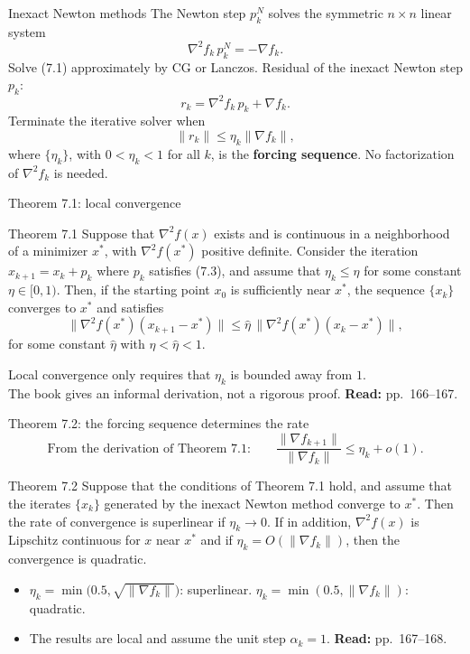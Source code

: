 \documentclass[aspectratio=169,12pt]{beamer}
\newcommand{\xs}{x^{*}}
\newcommand{\gradf}{\nabla f}
\newcommand{\hessf}{\nabla^{2} f}
\newcommand{\readbook}[1]{{\color{red}\textbf{Read:} #1}}
\begin{document}
\begin{frame}{Inexact Newton methods}
  The Newton step $p_{k}^{N}$ solves the symmetric $n\times n$ linear system
  \[ \hessf_{k}\,p_{k}^{N}=-\gradf_{k} . \tag{7.1} \]
  Solve (7.1) approximately by CG or Lanczos. Residual of the inexact Newton step $p_{k}$:
  \[ r_{k}=\hessf_{k}\,p_{k}+\gradf_{k} . \tag{7.2} \]
  Terminate the iterative solver when
  \[ \|r_{k}\|\le\eta_{k}\|\gradf_{k}\| , \tag{7.3} \]
  where $\{\eta_{k}\}$, with $0<\eta_{k}<1$ for all $k$, is the \textbf{forcing sequence}.
  No factorization of $\hessf_{k}$ is needed.
\end{frame}

\begin{frame}{Theorem 7.1: local convergence}
  \begin{block}{Theorem 7.1}
    Suppose that $\hessf(x)$ exists and is continuous in a neighborhood of a minimizer $\xs$,
    with $\hessf(\xs)$ positive definite. Consider the iteration $x_{k+1}=x_{k}+p_{k}$ where
    $p_{k}$ satisfies (7.3), and assume that $\eta_{k}\le\eta$ for some constant $\eta\in[0,1)$.
    Then, if the starting point $x_{0}$ is sufficiently near $\xs$, the sequence $\{x_{k}\}$
    converges to $\xs$ and satisfies
    \[ \|\hessf(\xs)(x_{k+1}-\xs)\|\le\hat\eta\,\|\hessf(\xs)(x_{k}-\xs)\| , \tag{7.4} \]
    for some constant $\hat\eta$ with $\eta<\hat\eta<1$.
  \end{block}

  Local convergence only requires that $\eta_{k}$ is bounded away from $1$.\\
  The book gives an informal derivation, not a rigorous proof. \readbook{pp.~166--167.}
\end{frame}

\begin{frame}{Theorem 7.2: the forcing sequence determines the rate}
  \[
    \text{From the derivation of Theorem 7.1:}\qquad
    \frac{\|\gradf_{k+1}\|}{\|\gradf_{k}\|}\le\eta_{k}+o(1) .
    \tag{7.8}
  \]

  \begin{block}{Theorem 7.2}
    Suppose that the conditions of Theorem 7.1 hold, and assume that the iterates $\{x_{k}\}$
    generated by the inexact Newton method converge to $\xs$. Then the rate of convergence
    is superlinear if $\eta_{k}\to 0$. If in addition, $\hessf(x)$ is Lipschitz continuous for $x$
    near $\xs$ and if $\eta_{k}=O(\|\gradf_{k}\|)$, then the convergence is quadratic.
  \end{block}

  \begin{itemize}\setlength\itemsep{0.25em}
    \item $\eta_{k}=\min\big(0.5,\sqrt{\|\gradf_{k}\|}\big)$: superlinear.\quad
      $\eta_{k}=\min(0.5,\|\gradf_{k}\|)$: quadratic.
    \item The results are local and assume the unit step $\alpha_{k}=1$.
      \readbook{pp.~167--168.}
  \end{itemize}
\end{frame}
\end{document}

